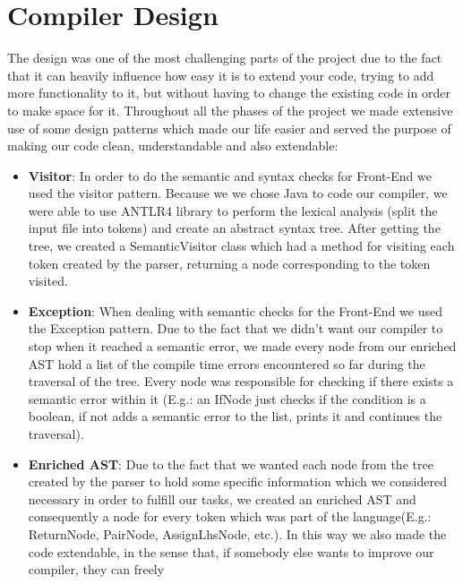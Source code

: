 \documentclass[11pt]{article}
\begin{document}
\section{Compiler Design}
\iffalse
THE DESIGN CHOICES(3/4)
1. An analysis of the design choices that you made during the WACC lab
2. Design patterns you used when designing your code and why you chose to use them.
\fi
The design was one of the most challenging parts of the project due to the fact
that it can heavily influence how easy it is to extend your code, trying to add
more functionality to it, but without having to change the existing code in order
to make space for it. Throughout all the phases of the project we made extensive
use of some design patterns which made our life easier and served the purpose of
making our code clean, understandable and also extendable:
\begin{itemize}[noitemsep,topsep=0pt]
  \item \textbf{Visitor}:
    In order to do the semantic and syntax checks for Front-End we used the visitor pattern.
    Because we we chose Java to code our compiler, we were able to use ANTLR4 library
    to perform the lexical analysis (split the input file into tokens) and create
    an abstract syntax tree. After getting the tree, we created a SemanticVisitor class
    which had a method for visiting each token created by the parser, returning
    a node corresponding to the token visited.
  \item \textbf{Exception}:
    When dealing with semantic checks for the Front-End we used the Exception pattern.
    Due to the fact that we didn't want our compiler to stop when it reached
    a semantic error, we made every node from our enriched AST hold a list
    of the compile time errors encountered so far during the traversal of the tree.
    Every node was responsible for checking if there exists a semantic error within it
    (E.g.: an IfNode just checks if the condition is a boolean, if not adds
    a semantic error to the list, prints it and continues the traversal).
  \item \textbf{Enriched AST}:
    Due to the fact that we wanted each node from the tree created by the parser
    to hold some specific information which we considered necessary in order
    to fulfill our tasks, we created an enriched AST and consequently a node
    for every token which was part of the language(E.g.: ReturnNode, PairNode,
    AssignLhsNode, etc.). In this way we also made the code extendable, in the
    sense that, if somebody else wants to improve our compiler, they can freely

\end{itemize}
\end{document}
